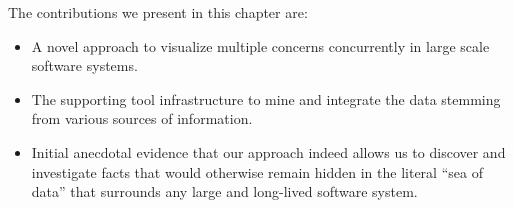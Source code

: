 The contributions we present in this chapter are:

\begin{itemize}

\item A novel approach to visualize multiple concerns concurrently in large scale software systems.

\item The supporting tool infrastructure to mine and integrate the data stemming from various sources of information.

\item Initial anecdotal evidence that our approach indeed allows us to discover and investigate facts that would otherwise remain hidden in the literal ``sea of data'' that surrounds any large and long-lived software system.

\end{itemize}


